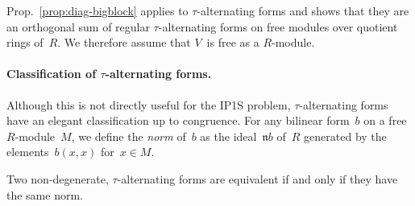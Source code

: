 \documentclass{article}%
\let\fr\mathfrak
\begin{document}
Prop.~\ref{prop:diag-bigblock} applies to $τ$-alternating forms and shows
that they are an orthogonal sum of regular $τ$-alternating forms on free
modules over quotient rings of~$R$. We therefore assume that $V$~is free
as a $R$-module.

\paragraph{Classification of $τ$-alternating forms.}
Although this is not directly useful for the IP1S problem,
$τ$-alternating forms have an elegant classification up to congruence.
For any bilinear form~$b$ on a free $R$-module~$M$, we define the
\emph{norm} of~$b$ as the ideal~$\fr{n} b$ of~$R$
generated by the elements~$b(x, x)$ for~$x ∈ M$.

\begin{prop}\label{prop:eqv-norm}%
Two non-degenerate, $τ$-alternating forms are equivalent if and only
if they have the same norm.
\end{prop}
\end{document}
